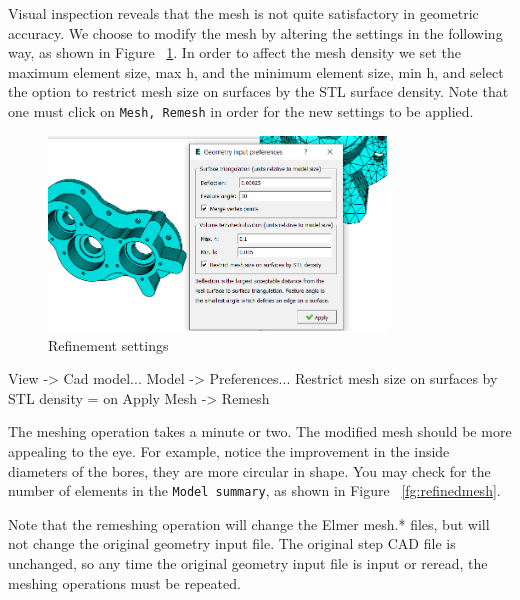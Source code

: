 Visual inspection reveals that the mesh is not quite satisfactory in geometric accuracy.  We choose to modify the mesh by altering the settings in the following way, as shown in Figure ~\ref{fg:refinement}.  In order to affect the mesh density we set the maximum element size, max h, and the minimum element size, min h, and select the option to restrict mesh size on surfaces by the STL surface density.  Note that one must click on \texttt{Mesh, Remesh} in order for the new settings to be applied.\\

\begin{figure}[H]
\begin{center}
\includegraphics[width=0.80\textwidth]{refinement}
\caption{Refinement settings}\label{fg:refinement}
\end{center}
\end{figure}

\ttbegin
View -> Cad model...
  Model -> Preferences...
    Restrict mesh size on surfaces by STL density = on
    Apply
Mesh -> Remesh
\ttend

The meshing operation takes a minute or two.  The modified mesh should be more appealing to the eye. For example, notice the improvement in the inside diameters of the bores, they are more circular in shape.  You  may check for the number of elements in the \texttt{Model summary}, as shown in Figure ~\ref{fg:refinedmesh}.

Note that the remeshing operation will change the Elmer mesh.* files, but will not change the original geometry input file.  The   original step CAD file is unchanged, so any time the original geometry input file is input or reread, the meshing operations must be repeated.\\

